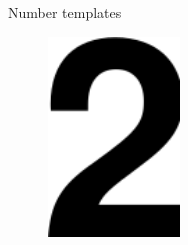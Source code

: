\begin{frame}[fragile]{Number templates}
	\begin{figure}[H]
		\begin{minipage}{0.40\linewidth}
			\includegraphics[width=\linewidth]{Immagini/2.png}
		\end{minipage}
		\vspace{0.20\linewidth}
		\begin{minipage}{0.40\linewidth}

\end{minipage}
\end{figure}
\end{frame}
